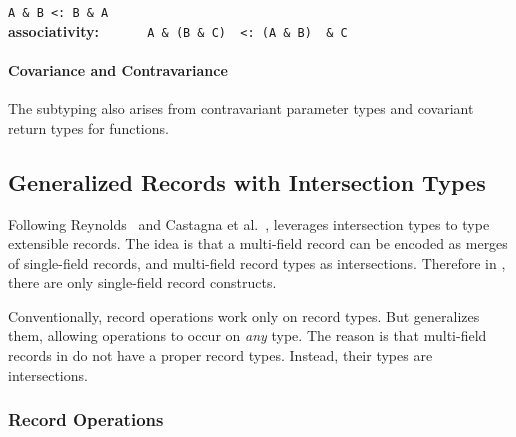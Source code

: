 \lstinline{A & B <: B & A}  \\
{\bf associativity:~~~~~~}\lstinline{A & (B & C)  <: (A & B)  & C}  

\paragraph{Covariance and Contravariance}
The subtyping also arises from contravariant parameter types
and covariant return types for functions. 



\subsection{Generalized Records with Intersection Types}

Following Reynolds~\cite{reynolds1997design} and Castagna et
al.~\cite{castagna1995calculus}, \name leverages intersection types to type
extensible records. The idea is that a multi-field record can be encoded as
merges of single-field records, and multi-field record types as intersections.
Therefore in \name, there are only single-field record constructs. 

Conventionally, record operations work only on record types. But \name
generalizes them, allowing operations to occur on \emph{any} type. The
reason is that multi-field records in \name do not have a proper
record types. Instead, their types are intersections.

\subsubsection{Record Operations}

